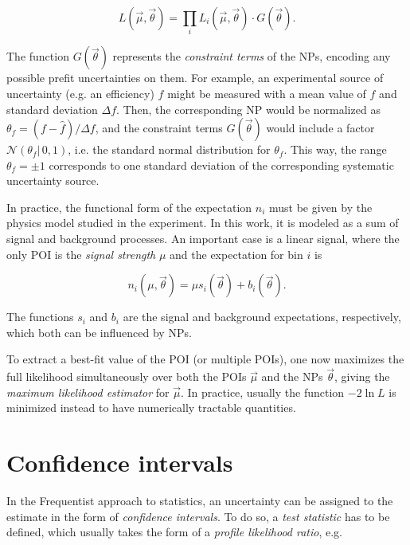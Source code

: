 \begin{equation}
    L (\vec{\mu}, \vec{\theta}) = \prod_i L_i (\vec{\mu}, \vec{\theta}) \cdot G(\vec{\theta}).
\end{equation}

The function $G(\vec{\theta})$ represents the \textit{constraint terms} of the NPs, encoding any possible prefit uncertainties on them. For example, an experimental source of uncertainty (e.g. an efficiency) $f$ might be measured with a mean value of $\hat{f}$ and standard deviation $\Delta f$. Then, the corresponding NP would be normalized as $\theta_f = (f-\hat{f})/\Delta f$, and the constraint terms $G(\vec{\theta})$ would include a factor $\mathcal{N}(\theta_f | \, 0,1)$, i.e. the standard normal distribution for $\theta_f$. This way, the range $\theta_f = \pm 1$ corresponds to one standard deviation of the corresponding systematic uncertainty source.

In practice, the functional form of the expectation $n_i$ must be given by the physics model studied in the experiment. In this work, it is modeled as a sum of signal and background processes. An important case is a linear signal, where the only POI is the \textit{signal strength} $\mu$ and the expectation for bin $i$ is

\begin{equation}
\label{eq:methods:linearsignal}
    n_i (\mu, \vec{\theta}) = \mu s_i (\vec{\theta}) + b_i (\vec{\theta}).
\end{equation}

The functions $s_i$ and $b_i$ are the signal and background expectations, respectively, which both can be influenced by NPs. 

To extract a best-fit value of the POI (or multiple POIs), one now maximizes the full likelihood simultaneously over both the POIs $\vec{\mu}$ and the NPs $\vec{\theta}$, giving the \textit{maximum likelihood estimator} for $\vec{\mu}$. In practice, usually the function $-2 \ln L$ is minimized instead to have numerically tractable quantities. 

\section{Confidence intervals}

In the Frequentist approach to statistics, an uncertainty can be assigned to the estimate in the form of \textit{confidence intervals}. To do so, a \textit{test statistic} has to be defined, which usually takes the form of a \textit{profile likelihood ratio}, e.g.~\cite{Cowan:2010js}

